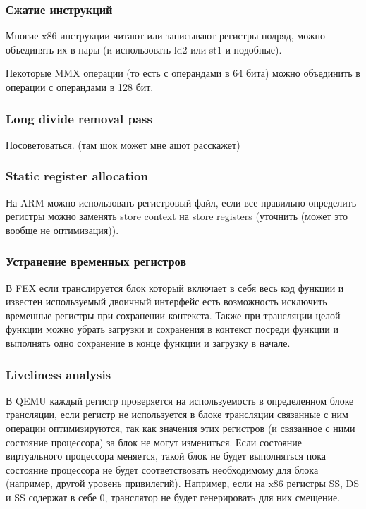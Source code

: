 \subsubsection{Сжатие инструкций}

Многие x86 инструкции читают или записывают регистры подряд, можно объединять их в пары (и использовать ld2 или st1 и подобные).

Некоторые MMX операции (то есть с операндами в 64 бита) можно объединить в операции с операндами в 128 бит.

\subsubsection{Long divide removal pass}

Посоветоваться. (там шок может мне ашот расскажет)

\subsubsection{Static register allocation}

На ARM можно использовать регистровый файл, если все правильно определить регистры можно заменять store context на store registers (уточнить (может это вообще не оптимизация)).

\subsubsection{Устранение временных регистров}

В FEX если транслируется блок который включает в себя весь код функции и известен используемый двоичный интерфейс есть возможность исключить временные регистры при сохранении контекста. Также при трансляции целой функции можно убрать загрузки и сохранения в контекст посреди функции и выполнять одно сохранение в конце функции и загрузку в начале.

\subsubsection{Liveliness analysis}

В QEMU каждый регистр проверяется на используемость в определенном блоке трансляции, если регистр не используется в блоке трансляции связанные с ним операции оптимизируются, так как значения этих регистров (и связанное с ними состояние процессора) за блок не могут измениться. Если состояние виртуального процессора меняется, такой блок не будет выполняться пока состояние процессора не будет соответствовать необходимому для блока (например, другой уровень привилегий). Например, если на x86 регистры SS, DS и SS содержат в себе 0, транслятор не будет генерировать для них смещение.

